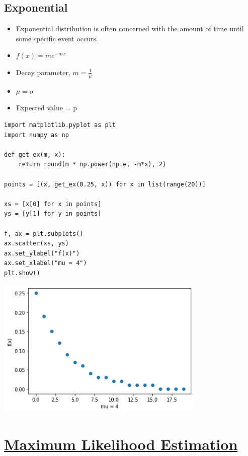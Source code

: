 \documentclass[11pt]{article}
\begin{document}
\subsection{Exponential}
\label{sec:orgb166fff}

\begin{itemize}
\item Exponential distribution is often concerned with the amount of time until some specific event occurs.
\item \(f(x) = me^{-mx}\)
\item Decay parameter, \(m = \frac{1}{\mu}\)
\item \(\mu = \sigma\)
\item Expected value = p
\end{itemize}

\begin{verbatim}
import matplotlib.pyplot as plt
import numpy as np

def get_ex(m, x):
    return round(m * np.power(np.e, -m*x), 2)

points = [(x, get_ex(0.25, x)) for x in list(range(20))]

xs = [x[0] for x in points]
ys = [y[1] for y in points]

f, ax = plt.subplots()
ax.scatter(xs, ys)
ax.set_ylabel("f(x)")
ax.set_xlabel("mu = 4")
plt.show()
\end{verbatim}

\begin{center}
\includegraphics[width=10cm]{./obipy-resources/ZODX3e.png}
\end{center}

\section{\underline{Maximum Likelihood Estimation}}
\label{sec:orgc1e4423}
\end{document}
